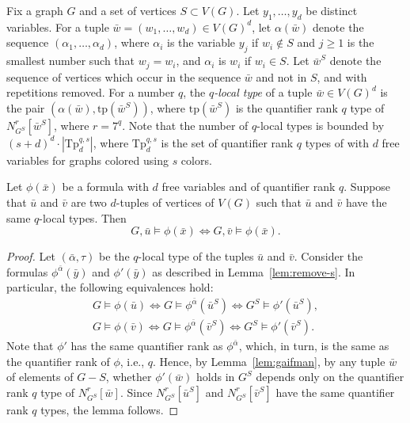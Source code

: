Fix a graph $G$  and a set of vertices  $S\subset V(G)$.
%
Let $y_1,\ldots,y_d$ be distinct variables.
For a tuple $\bar w=(w_1,\ldots,w_d)\in V(G)^d$, let 
$\alpha(\bar w)$ denote the sequence 
 $(\alpha_1,\ldots,\alpha_d)$,
 where $\alpha_i$ is the variable $y_j$
 if $w_i\not\in S$ and $j\ge 1$  
 is the smallest number such that $w_j=w_i$,
 and $\alpha_i$ is $w_i$ if $w_i\in S$.
Let $\bar w^S$ denote the sequence of vertices
which occur in the sequence $\bar w$ and not in $S$, and with repetitions removed.
For a number $q$, the \emph{$q$-local type} of a tuple $\bar w\in V(G)^d$
is the pair $(\alpha(\bar w),\mathrm{tp}(\bar w^S))$,
where $\mathrm{tp}(\bar w^S)$ is the quantifier rank $q$
type of  $N^r_{G^S}[\bar w^S]$, where $r=7^q$.
Note that the number of $q$-local types is bounded by 
$(s+d)^d\cdot |\mathrm{Tp}^{q,s}_{d}|$,
where $\mathrm{Tp}^{q,s}_{d}$
is the set of quantifier rank $q$ types of 
with $d$ free variables for graphs colored using $s$ colors.




\begin{lemma}\label{lem:coloring}
	Let $\phi(\bar x)$ be a formula with
	 $d$ free variables and of quantifier rank $q$.
	Suppose that $\bar u$ and $\bar v$ are two  $d$-tuples of 
	vertices of $V(G)$ such that  $\bar u$ and $\bar v$ have the same $q$-local types. Then $$G,\bar u\models \phi(\bar x)\iff G,\bar v\models \phi(\bar x).$$
\end{lemma}
\begin{proof}
Let $(\bar \alpha,\tau)$ be the $q$-local type of the tuples $\bar u$ and $\bar v$.
	Consider the formulas $\phi^{\bar \alpha}(\bar y)$ and $\phi'(\bar y)$ as described in Lemma~\ref{lem:remove-s}.
	In particular, the following equivalences hold:
	\begin{align*}
	G\models\phi(\bar u)\iff G\models\phi^{\bar\alpha}(\bar u^S)\iff G^S\models\phi'(\bar u^S),\\
	G\models\phi(\bar v)\iff G\models\phi^{\bar\alpha}(\bar v^S)\iff G^S\models\phi'(\bar v^S).
	\end{align*}
		Note that $\phi'$ has the same quantifier rank as $\phi^{\bar \alpha}$, which, in turn, is the same as the quantifier rank of $\phi$, i.e., $q$. Hence, by Lemma~\ref{lem:gaifman}, by any tuple $\bar w$ of elements of $G-S$, whether $\phi'(\bar w)$ holds in $G^S$ depends only on the quantifier rank $q$ type of $N^r_{G^S}[\bar w]$. Since $N^r_{G^S}[\bar u^S]$ and $N^r_{G^S}[\bar v^S]$ have the same quantifier rank $q$ types, the  lemma follows.
\end{proof}

